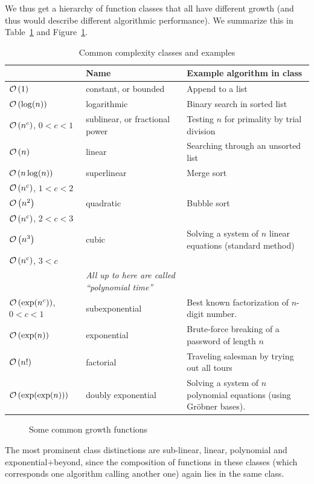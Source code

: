We thus get a hierarchy of function classes that all have different growth
(and thus would describe different algorithmic performance).
We summarize this in Table~\ref{tabcomplcla} and Figure~\ref{figcomcl}.
\begin{table}
\begin{tabular}{p{24mm}|p{30mm}|p{40mm}}
&Name&Example algorithm in class\\
\hline
${\mathcal O}\/\left(1\right)$&constant, or bounded&Append to a list\\
${\mathcal O}\/\left(\log(n)\right)$&logarithmic&Binary search in sorted list\\
${\mathcal O}\/\left(n^c\right)$, $0<c<1$&sublinear, or fractional power&Testing $n$ for primality by trial division\\
${\mathcal O}\/\left(n\right)$&linear&Searching through an unsorted list\\
${\mathcal O}\/\left(n\log(n)\right)$&superlinear&Merge sort\\
${\mathcal O}\/\left(n^c\right)$, $1<c<2$&&\\
${\mathcal O}\/\left(n^2\right)$&quadratic&Bubble sort\\
${\mathcal O}\/\left(n^c\right)$, $2<c<3$&&\\
${\mathcal O}\/\left(n^3\right)$&cubic&Solving a system of $n$ linear equations (standard
method)\\
${\mathcal O}\/\left(n^c\right)$, $3<c$&&\\
&{\em All up to here are called ``polynomial time''}&\\
${\mathcal O}\/\left(\exp(n^c)\right)$, $0<c<1$&subexponential&Best known factorization of
$n$-digit number.\\
${\mathcal O}\/\left(\exp(n)\right)$&exponential&Brute-force breaking of a password of length $n$\\
${\mathcal O}\/\left(n!\right)$&factorial&Traveling salesman by trying out all tours\\
${\mathcal O}\/\left(\exp(\exp(n))\right)$&doubly exponential&Solving a system of $n$ polynomial equations (using Gr\"obner bases).
\end{tabular}
\caption{Common complexity classes and examples}
\label{tabcomplcla}
\end{table}
\begin{figure}
\begin{center}
\end{center}
\caption{Some common growth functions}
\label{figcomcl}
\end{figure}
The most prominent class distinctions are sub-linear, linear, polynomial and
exponential+beyond, since the composition of functions in these classes
(which corresponds one algorithm calling another one)
again lies in the same class.


